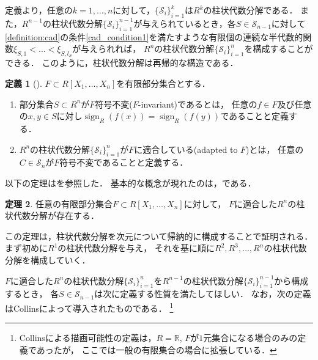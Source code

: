\documentclass[uplatex, dvipdfmx]{jsarticle}
\numberwithin{equation}{section}
\newcommand{\R}{\mathbb{R}}
\DeclareMathOperator{\sign}{sign}
\theoremstyle{definition}
\newtheorem{definition}{定義}[section]
\newtheorem{theorem}[definition]{定理}
\begin{document}
定義より，任意の$k=1, \dots, n$に対して，$\{\mathcal{S}_i\}_{i=1}^k$は$R^k$の柱状代数分解である．
また，$R^{n-1}$の柱状代数分解$\{\mathcal{S}_i\}_{i=1}^{n-1}$が与えられているとき，各$S \in \mathcal{S}_{n-1}$に対して
\cref{definition:cad}の条件\ref{cad_condition1}を満たすような有限個の連続な半代数的関数$\xi_{S,1}<\dots<\xi_{S,l_S}$が与えられれば，
$R^n$の柱状代数分解$\{\mathcal{S}_i\}_{i=1}^n$を構成することができる．
このように，柱状代数分解は再帰的な構造である．

\begin{definition}[{\cite[Definition 5.5]{MR2248869}}]
     $F \subset R[X_1, \dots, X_n]$を有限部分集合とする．
     \begin{enumerate}
          \item 部分集合$S \subset R^n$が$F$符号不変($F$-invariant)であるとは，
          任意の$f \in F$及び任意の$x,y \in S$に対し$\sign_R(f(x))=\sign_R(f(y))$であることと定義する．

          \item $R^n$の柱状代数分解$\{\mathcal{S}_i\}_{i=1}^n$が$F$に適合している(adapted to $F$)とは，
          任意の$C \in \mathcal{S}_n$が$F$符号不変であることと定義する．
     \end{enumerate}
\end{definition}

以下の定理は\cite[Theorem 5.6]{MR2248869}を参照した．
基本的な概念が現れたのは，\cite{MR0403962}である．
\begin{theorem} \label{theorem:cad}
     任意の有限部分集合$F \subset R[X_1, \dots, X_n]$に対して，
     $F$に適合した$R^n$の柱状代数分解が存在する．
\end{theorem}

この定理は，柱状代数分解を次元について帰納的に構成することで証明される．
まず初めに$R^1$の柱状代数分解を与え，
それを基に順に$R^2, R^3, \dots, R^n$の柱状代数分解を構成していく．

$F$に適合した$R^n$の柱状代数分解$\{\mathcal{S}_i\}_{i=1}^n$を$R^{n-1}$の柱状代数分解$\{\mathcal{S}_i\}_{i=1}^{n-1}$から構成するとき，
各$S \in \mathcal{S}_{n-1}$は次に定義する性質を満たしてほしい．
なお，次の定義はCollins\cite{MR0403962}によって導入されたものである．
\footnote{
     Collins\cite{MR0403962}による描画可能性の定義は，$R=\R$, $F$が$1$元集合になる場合のみの定義であったが，
     ここでは一般の有限集合の場合に拡張している．
}
\end{document}
